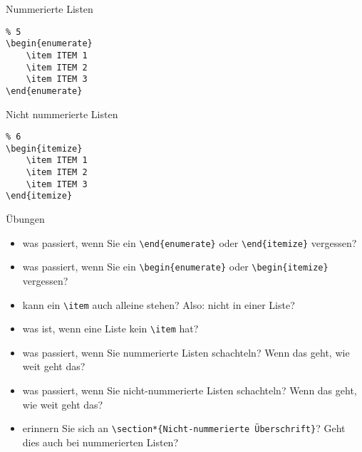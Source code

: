 \begin{frame}[fragile]{Nummerierte Listen}

\begin{verbatim}
% 5
\begin{enumerate}
    \item ITEM 1
    \item ITEM 2
    \item ITEM 3
\end{enumerate}
\end{verbatim}

\end{frame}

\begin{frame}[fragile]{Nicht nummerierte Listen}

\begin{verbatim}
% 6
\begin{itemize}
    \item ITEM 1
    \item ITEM 2
    \item ITEM 3
\end{itemize}
\end{verbatim}

\end{frame}

\begin{frame}{Übungen}

\begin{itemize}
\itemsep1pt\parskip0pt
\item
  was passiert, wenn Sie ein \texttt{\textbackslash{}end\{enumerate\}}
  oder \texttt{\textbackslash{}end\{itemize\}} vergessen?
\item
  was passiert, wenn Sie ein \texttt{\textbackslash{}begin\{enumerate\}}
  oder \texttt{\textbackslash{}begin\{itemize\}} vergessen?
\item
  kann ein \texttt{\textbackslash{}item} auch alleine stehen? Also:
  nicht in einer Liste?
\item
  was ist, wenn eine Liste kein \texttt{\textbackslash{}item} hat?
\item
  was passiert, wenn Sie nummerierte Listen schachteln? Wenn das geht,
  wie weit geht das?
\item
  was passiert, wenn Sie nicht-nummerierte Listen schachteln? Wenn das
  geht, wie weit geht das?
\item
  erinnern Sie sich an
  \texttt{\textbackslash{}section*\{Nicht-nummerierte\ Überschrift\}}?
  Geht dies auch bei nummerierten Listen?
\end{itemize}

\end{frame}

